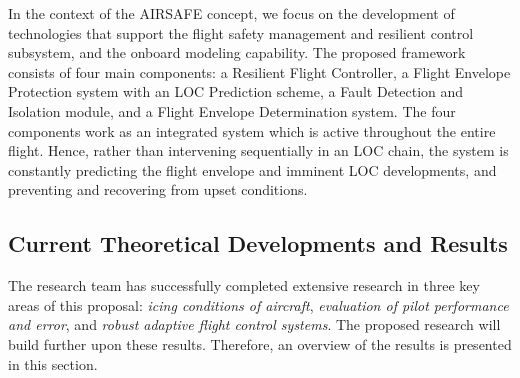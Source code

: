 \documentclass[letter,onecolumn,12pt]{aiaa-tc}
\begin{document}




In the context of the AIRSAFE concept, we focus on the development of technologies that support the flight safety management and resilient control subsystem, and the onboard modeling capability. The proposed framework consists of four main components: a Resilient Flight Controller, a Flight Envelope Protection system with an LOC Prediction scheme, a Fault Detection and Isolation module, and a Flight Envelope Determination system. The four components work as an integrated system which is active throughout the entire flight. Hence, rather than intervening sequentially in an LOC chain, the system is constantly predicting the flight envelope and imminent LOC developments, and preventing and recovering from upset conditions.


\subsection{Current Theoretical Developments and Results}
\label{subsec:current_develop}

The research team has successfully completed extensive research in three key areas of this proposal: \emph{icing conditions of aircraft}, \emph{evaluation of pilot performance and error}, and \emph{robust adaptive flight control systems}. The proposed research will build further upon these results. Therefore, an overview of the results is presented in this section.
\end{document}
